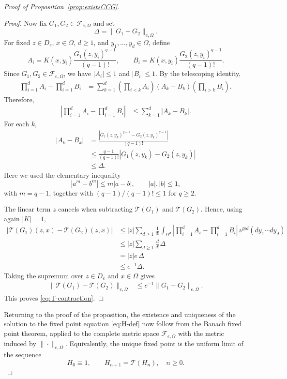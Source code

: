 \documentclass[12pt]{article}
\begin{document}
\begin{proof}[Proof of Proposition~\ref{prop:existsCCG}]
\begin{proof}
Now fix $G_1,G_2\in\mathcal F_{e,\Omega}$ and set
\begin{equation*}
\Delta=\|G_1-G_2\|_{e,\Omega}.
\end{equation*}
For fixed $z\in D_e$, $x\in\Omega$, $d\ge1$, and $y_1,\ldots,y_d\in\Omega$, define
\begin{equation*}
A_i
=
K(x,y_i)\frac{G_1(z,y_i)^{q-1}}{(q-1)!},
\qquad
B_i
=
K(x,y_i)\frac{G_2(z,y_i)^{q-1}}{(q-1)!}.
\end{equation*}
Since $G_1,G_2\in\mathcal F_{e,\Omega}$, we have $|A_i|\le1$ and $|B_i|\le1$. By the telescoping identity,
\begin{align*}
\prod_{i=1}^d A_i-\prod_{i=1}^d B_i
&=
\sum_{k=1}^d
\left(\prod_{i<k}A_i\right)
(A_k-B_k)
\left(\prod_{i>k}B_i\right).
\end{align*}
Therefore,
\begin{align*}
\left|
\prod_{i=1}^d A_i-\prod_{i=1}^d B_i
\right|
&\le
\sum_{k=1}^d |A_k-B_k|.
\end{align*}
For each $k$,
\begin{align*}
|A_k-B_k|
&=
\frac{\left|G_1(z,y_k)^{q-1}-G_2(z,y_k)^{q-1}\right|}{(q-1)!}\\
&\le
\frac{q-1}{(q-1)!}
|G_1(z,y_k)-G_2(z,y_k)|\\
&\le
\Delta.
\end{align*}
Here we used the elementary inequality
\begin{equation*}
|a^m-b^m|
\le
m|a-b|,
\qquad |a|,|b|\le1,
\end{equation*}
with $m=q-1$, together with $(q-1)/(q-1)!\le1$ for $q\ge2$.

The linear term $z$ cancels when subtracting $\mathcal T(G_1)$ and $\mathcal T(G_2)$. Hence, using again $|K|=1$,
\begin{align*}
|\mathcal T(G_1)(z,x)-\mathcal T(G_2)(z,x)|
&\le
|z|
\sum_{d\ge1}\frac{1}{d!}
\int_{\Omega^d}
\left|
\prod_{i=1}^d A_i-\prod_{i=1}^d B_i
\right|
\,\nu^{\otimes d}(dy_1\cdots dy_d)\\
&\le
|z|
\sum_{d\ge1}\frac{d}{d!}\Delta\\
&=
|z|e\,\Delta\\
&\le
e^{-1}\Delta.
\end{align*}
Taking the supremum over $z\in D_e$ and $x\in\Omega$ gives
\begin{align*}
\|\mathcal T(G_1)-\mathcal T(G_2)\|_{e,\Omega}
&\le
e^{-1}\|G_1-G_2\|_{e,\Omega}.
\end{align*}
This proves \eqref{eq:T-contraction}.
\end{proof}


Returning to the proof of the proposition, the existence and uniqueness of the solution to the fixed point equation \eqref{eq:H-def} now follow from the Banach fixed point theorem, applied to the complete metric space $\mathcal F_{e,\Omega}$ with the metric induced by $\|\cdot\|_{e,\Omega}$. Equivalently, the unique fixed point is the uniform limit of the sequence
\begin{equation*}
H_0\equiv 1,\qquad H_{n+1}=\mathcal T(H_n),\quad n\ge0.
\end{equation*}
\end{proof}
\end{document}
